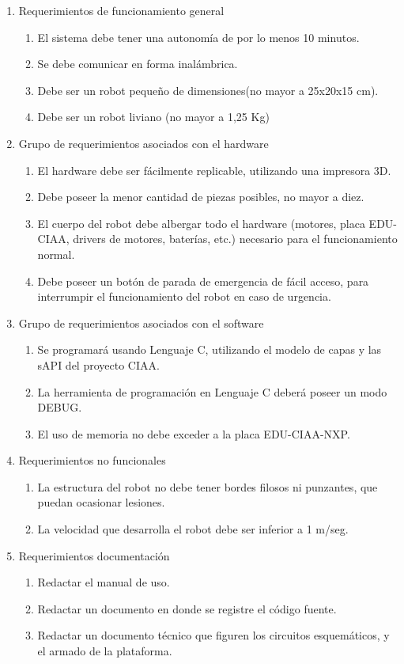 \documentclass[11pt]{charter}
\begin{document}
\begin{enumerate}
\item Requerimientos de funcionamiento general
	\begin{enumerate}
	\item El sistema debe tener una autonomía de por lo menos 10 minutos.
	\item Se debe comunicar en forma inalámbrica. 
	\item Debe ser un robot pequeño de dimensiones(no mayor a 25x20x15 cm).
	\item Debe ser un robot liviano (no mayor a 1,25 Kg)
	\end{enumerate}
\item Grupo de requerimientos asociados con el hardware
	\begin{enumerate}
	\item El hardware debe ser fácilmente replicable, utilizando una impresora 3D.
	\item Debe poseer la menor cantidad de piezas posibles, no mayor a diez. 
	\item El cuerpo del robot debe albergar todo el hardware (motores, placa EDU-CIAA, drivers de motores, baterías, etc.) necesario para el funcionamiento normal.
	\item Debe poseer un botón de parada de emergencia de fácil acceso, para interrumpir el funcionamiento del robot en caso de urgencia.
	\end{enumerate}
\item Grupo de requerimientos asociados con el software
	\begin{enumerate}
	\item Se programará usando Lenguaje C, utilizando el modelo de capas y las sAPI del proyecto CIAA.
	\item La herramienta de programación en Lenguaje C deberá poseer un modo DEBUG.
	\item El uso de memoria no debe exceder a la placa EDU-CIAA-NXP.
	\end{enumerate}
\item Requerimientos no funcionales
	\begin{enumerate}
	\item La estructura del robot no debe tener bordes filosos ni punzantes, que puedan ocasionar lesiones. 
	\item La velocidad que desarrolla el robot debe ser inferior a 1 m/seg.
	\end{enumerate}
\item Requerimientos documentación
	\begin{enumerate}
	\item Redactar el manual de uso. 
	\item Redactar un documento en donde se registre el código 
	fuente.
	\item Redactar un documento técnico que figuren los circuitos
	esquemáticos, y el armado de la plataforma.
	\end{enumerate}
\end{enumerate}
\end{document}
